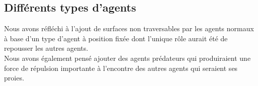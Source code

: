 \documentclass[12pt,a4paper,sans]{article}
\begin{document}
\subsection{Différents types d'agents}
Nous avons réfléchi à l'ajout de surfaces non traversables par les agents normaux à base d'un type d'agent à position fixée dont l'unique rôle aurait été de repousser les autres agents.\\
Nous avons également pensé ajouter des agents prédateurs qui produiraient une force de répulsion importante à l'encontre des autres agents qui seraient ses proies.


\end{document}
